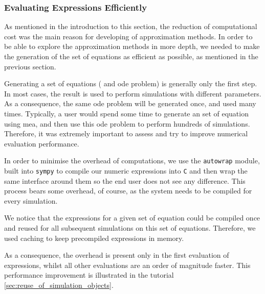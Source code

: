 \subsubsection{Evaluating Expressions Efficiently}

As mentioned in the introduction to this section, the reduction of computational cost was the main reason for developing of approximation methods.
In order to be able to explore the approximation methods in more depth,
we needed to make the generation of the set of equations as efficient as possible, as mentioned in the previous section.

Generating a set of equations (\ie{} and \gls{ode} problem) is generally only the first step.
In most cases, the result is used to perform simulations with different parameters.
As a consequence, the same \gls{ode} problem will be generated once, and used many times.
Typically, a user would spend some time to generate an set of equation using \gls{mea}, and then use this \gls{ode} problem to perform hundreds of simulations.
Therefore, it was extremely important to assess and try to improve numerical evaluation performance.
 


In order to minimise the overhead of computations, we use the {\tt autowrap} module, built into {\tt sympy} to compile our numeric expressions into \texttt{C}
and then wrap the same \py{} interface around them so the end user does not see any difference.
This process bears some overhead, of course, as the system needs to be compiled for every simulation.

We notice that the expressions for a given set of equation could be compiled once and reused for all subsequent simulations on this set of equations.
Therefore, we used caching to keep precompiled expressions in memory.
 
As a consequence, the overhead is present only in the first evaluation of expressions, whilst all other evaluations are an order of magnitude faster.
This performance improvement is illustrated in the tutorial \autoref{sec:reuse_of_simulation_objects}.

